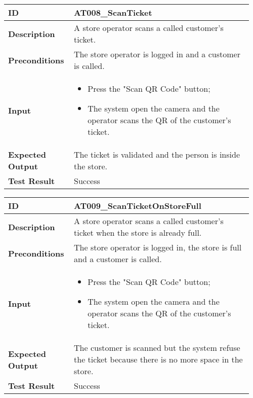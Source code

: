 \begin{table}[H]
	\centering
	\begin{tabular}{@{}p{0.25\linewidth}p{0.71\linewidth}@{}}
		\toprule
		\textbf{ID} & AT008\_ScanTicket \\
		\midrule
		\textbf{Description} & A store operator scans a called customer's ticket. \\
		\midrule
		\textbf{Preconditions} & The store operator is logged in and a customer is called.\\
		\midrule
		\textbf{Input} & \begin{itemize}[leftmargin=.4cm,noitemsep,topsep=0pt,before=\vspace{-3mm},after=\vspace{-4mm}]
			\item Press the "Scan QR Code" button;
			\item The system open the camera and the operator scans the QR of the customer's ticket.
		\end{itemize}\\
		\midrule
		\textbf{Expected Output} & The ticket is validated and the person is inside the store.\\
		\midrule
		\textbf{Test Result} & Success\\
		\bottomrule
	\end{tabular}
\end{table}

\begin{table}[H]
	\centering
	\begin{tabular}{@{}p{0.25\linewidth}p{0.71\linewidth}@{}}
		\toprule
		\textbf{ID} & AT009\_ScanTicketOnStoreFull \\
		\midrule
		\textbf{Description} & A store operator scans a called customer's ticket when the store is already full. \\
		\midrule
		\textbf{Preconditions} & The store operator is logged in, the store is full and a customer is called.\\
		\midrule
		\textbf{Input} & \begin{itemize}[leftmargin=.4cm,noitemsep,topsep=0pt,before=\vspace{-3mm},after=\vspace{-4mm}]
			\item Press the "Scan QR Code" button;
			\item The system open the camera and the operator scans the QR of the customer's ticket.
		\end{itemize}\\
		\midrule
		\textbf{Expected Output} & The customer is scanned but the system refuse the ticket because there is no more space in the store.\\
		\midrule
		\textbf{Test Result} & Success\\
		\bottomrule
	\end{tabular}
\end{table}

